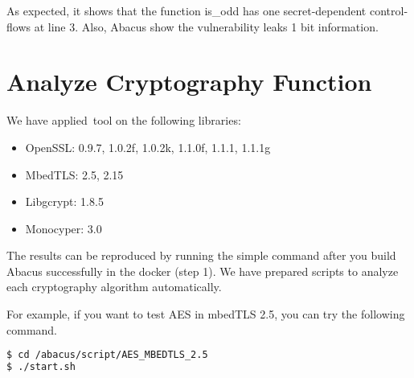 \documentclass[10pt,conference]{IEEEtran}
\begin{document}
As expected, it shows that the function is\_odd has one secret-dependent control-flows at line 3. Also, Abacus show the vulnerability leaks 1 bit information.

\section{Analyze Cryptography Function}
We have applied~tool{} on the following libraries:
\begin{itemize}
\item OpenSSL: 0.9.7, 1.0.2f, 1.0.2k, 1.1.0f, 1.1.1, 1.1.1g
\item MbedTLS: 2.5, 2.15
\item Libgcrypt: 1.8.5
\item Monocyper: 3.0
\end{itemize}

The results can be reproduced by running the simple command after you build Abacus successfully in the docker (step 1). We have prepared scripts to analyze each cryptography algorithm automatically.

For example, if you want to test AES in mbedTLS 2.5, you can try the 
following command.

\begin{lstlisting}[language=bash]
$ cd /abacus/script/AES_MBEDTLS_2.5
$ ./start.sh
\end{lstlisting}
\end{document}
